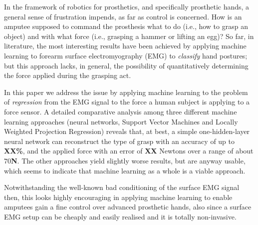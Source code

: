 In the framework of robotics for prosthetics, and specifically
prosthetic hands, a general sense of frustration impends, as far as
control is concerned. How is an amputee supposed to command the
prosthesis what to do (i.e., how to grasp an object) and with what
force (i.e., grasping a hammer or lifting an egg)? So far, in
literature, the most interesting results have been achieved by
applying machine learning to forearm surface electromyography (EMG) to
\emph{classify} hand postures; but this approach lacks, in general,
the possibility of quantitatively determining the force applied during
the grasping act.

In this paper we address the issue by applying machine learning to the
problem of \emph{regression} from the EMG signal to the force a human
subject is applying to a force sensor. A detailed comparative analysis
among three different machine learning approaches (neural networks,
Support Vector Machines and Locally Weighted Projection Regression)
reveals that, at best, a simple one-hidden-layer neural network can
reconstruct the type of grasp with an accuracy of up to \textbf{XX\%},
and the applied force with an error of \textbf{XX} Newtons over a
range of about \textbf{$70$N}. The other approaches yield slightly
worse results, but are anyway usable, which seems to indicate that
machine learning as a whole is a viable approach.

Notwithstanding the well-known bad conditioning of the surface EMG
signal then, this looks highly encouraging in applying machine
learning to enable amputees gain a fine control over advanced
prosthetic hands, also since a surface EMG setup can be cheaply and
easily realised and it is totally non-invasive.
